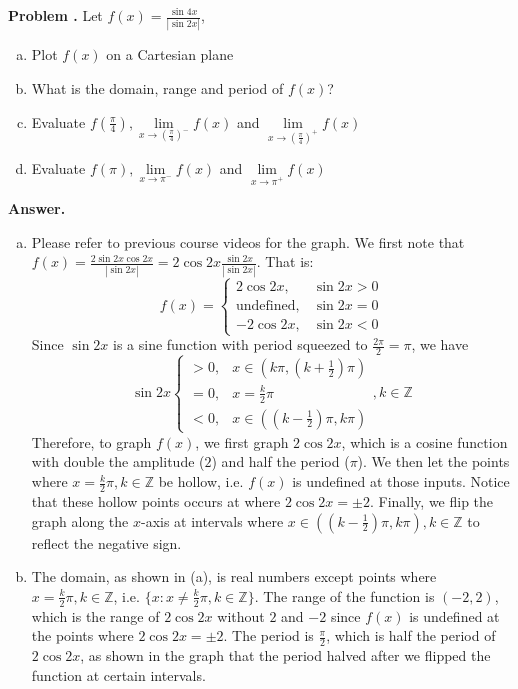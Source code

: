 \documentclass[11pt,letterpaper]{article}
\newcounter{problem}
\newcommand{\problem}{
	\stepcounter{problem}%
	\noindent \textbf{Problem \theproblem. }%
}
\newcommand{\answer}{\noindent \textbf{Answer. }}
\begin{document}
\problem Let $f(x) = \frac{\sin 4x}{|\sin 2x|}$, 
\begin{enumerate}[(a)]
    \item Plot $f(x)$ on a Cartesian plane
    \item What is the domain, range and period of $f(x)$?
    \item Evaluate $f\left(\frac{\pi}{4}\right), \lim\limits_{x \to  \left(\frac{\pi}{4}\right)^-} f(x)$ and $\lim\limits_{x \to \left(\frac{\pi}{4}\right)^+} f(x)$
    \item Evaluate $f(\pi), \lim\limits_{x \to  \pi^-} f(x)$ and $\lim\limits_{x \to \pi^+} f(x)$
\end{enumerate}

\answer
\begin{enumerate}[(a)]
    \item Please refer to previous course videos for the graph.  We first note that $f(x) = \frac{2\sin 2x\cos 2x}{|\sin 2x|} = 2\cos 2x \frac{\sin 2x}{|\sin 2x|}$.  That is:
    \[f(x) = \left\{
    \begin{array}{lr}
        2\cos 2x, &  \sin 2x > 0\\
        \text{undefined}, & \sin 2x = 0\\
        -2\cos 2x, & \sin 2x < 0
    \end{array}
    \right.\]
    Since $\sin 2x$ is a sine function with period squeezed to $\frac{2\pi}{2} = \pi$, we have
    \[\sin 2x \left\{
        \begin{array}{ll}
            >0, & x \in \left(k\pi, \left(k+\frac{1}{2}\right)\pi\right)\\
            =0, & x = \frac{k}{2}\pi\\
            <0, & x \in \left(\left(k-\frac{1}{2}\right)\pi, k\pi\right)
        \end{array}
    \right., k \in \mathbb{Z}\]
    Therefore, to graph $f(x)$, we first graph $2\cos 2x$, which is a cosine function with double the amplitude ($2$) and half the period ($\pi$).  We then let the points where $x = \frac{k}{2}\pi, k \in \mathbb{Z}$ be hollow, i.e. $f(x)$ is undefined at those inputs. Notice that these hollow points occurs at where $2 \cos 2x = \pm 2$.  Finally, we flip the graph along the $x$-axis at intervals where $x \in \left(\left(k-\frac{1}{2}\right)\pi, k\pi\right), k \in \mathbb{Z}$ to reflect the negative sign.   
    \item The domain, as shown in (a), is real numbers except points where $x = \frac{k}{2}\pi, k\in\mathbb{Z}$, i.e. $\{x: x\ne \frac{k}{2}\pi, k \in \mathbb{Z}\}$.  The range of the function is $(-2,2)$, which is the range of $2 \cos 2x$ without $2$ and $-2$ since $f(x)$ is undefined at the points where $2 \cos 2x = \pm 2$.  The period is $\frac{\pi}{2}$, which is half the period of $2 \cos 2x$, as shown in the graph that the period halved after we flipped the function at certain intervals.

\end{enumerate}
\end{document}
